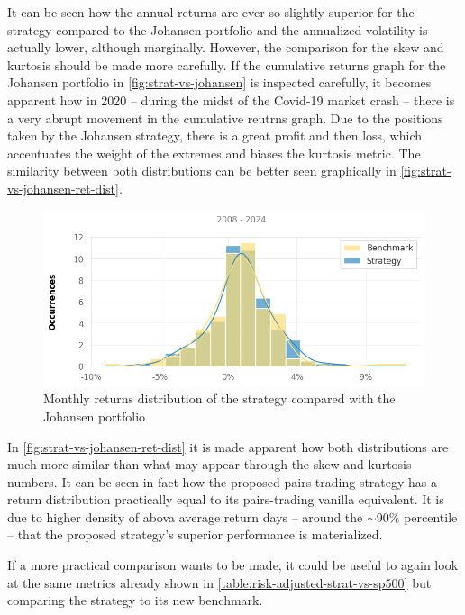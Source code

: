It can be seen how the annual returns are ever so slightly superior for the strategy compared to the Johansen portfolio and the annualized volatility is actually lower, although marginally. However, the comparison for the skew and kurtosis should be made more carefully. If the cumulative returns graph for the Johansen portfolio in \autoref{fig:strat-vs-johansen} is inspected carefully, it becomes apparent how in 2020 -- during the midst of the Covid-19 market crash -- there is a very abrupt movement in the cumulative reutrns graph. Due to the positions taken by the Johansen strategy, there is a great profit and then loss, which accentuates the weight of the extremes and biases the kurtosis metric. The similarity between both distributions can be better seen graphically in \autoref{fig:strat-vs-johansen-ret-dist}.

\begin{figure}[ht]
    \captionsetup{justification=centering}
    \includegraphics[width=\linewidth]{assets/strat-vs-johansen-ret-dist.png}
    \caption{Monthly returns distribution of the strategy compared with the Johansen portfolio}
    \label{fig:strat-vs-johansen-ret-dist}
\end{figure}

In \autoref{fig:strat-vs-johansen-ret-dist} it is made apparent how both distributions are much more similar than what may appear through the skew and kurtosis numbers. It can be seen in fact how the proposed pairs-trading strategy has a return distribution practically equal to its pairs-trading vanilla equivalent. It is due to higher density of abova average return days -- around the $\sim$90\% percentile -- that the proposed strategy's superior performance is materialized.    

If a more practical comparison wants to be made, it could be useful to again look at the same metrics already shown in \autoref{table:risk-adjusted-strat-vs-sp500} but comparing the strategy to its new benchmark. 

